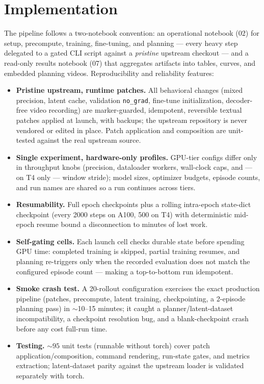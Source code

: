 \documentclass[11pt,a4paper]{article}
\begin{document}
\section{Implementation}
\label{sec:implementation}

The pipeline follows a two-notebook convention: an operational notebook (02)
for setup, precompute, training, fine-tuning, and planning --- every heavy step
delegated to a gated CLI script against a \emph{pristine} upstream checkout ---
and a read-only results notebook (07) that aggregates artifacts into tables,
curves, and embedded planning videos. Reproducibility and reliability features:

\begin{itemize}[leftmargin=1.4em]
  \item \textbf{Pristine upstream, runtime patches.} All behavioral changes
        (mixed precision, latent cache, validation \texttt{no\_grad},
        fine-tune initialization, decoder-free video recording) are
        marker-guarded, idempotent, reversible textual patches applied at
        launch, with backups; the upstream repository is never vendored or
        edited in place. Patch application and composition are unit-tested
        against the real upstream source.
  \item \textbf{Single experiment, hardware-only profiles.} GPU-tier configs
        differ only in throughput knobs (precision, dataloader workers,
        wall-clock caps, and --- on T4 only --- window stride); model sizes,
        optimizer budgets, episode counts, and run names are shared so a run
        continues across tiers.
  \item \textbf{Resumability.} Full epoch checkpoints plus a rolling
        intra-epoch state-dict checkpoint (every 2000 steps on A100, 500 on
        T4) with deterministic mid-epoch resume bound a disconnection to
        minutes of lost work.
  \item \textbf{Self-gating cells.} Each launch cell checks durable state
        before spending GPU time: completed training is skipped, partial
        training resumes, and planning re-triggers only when the recorded
        evaluation does not match the configured episode count --- making a
        top-to-bottom run idempotent.
  \item \textbf{Smoke crash test.} A 20-rollout configuration exercises the
        exact production pipeline (patches, precompute, latent training,
        checkpointing, a 2-episode planning pass) in $\sim$10--15 minutes; it
        caught a planner/latent-dataset incompatibility, a checkpoint
        resolution bug, and a blank-checkpoint crash before any cost full-run
        time.
  \item \textbf{Testing.} ${\sim}95$ unit tests (runnable without torch) cover
        patch application/composition, command rendering, run-state gates, and
        metrics extraction; latent-dataset parity against the upstream loader
        is validated separately with torch.
\end{itemize}
\end{document}
